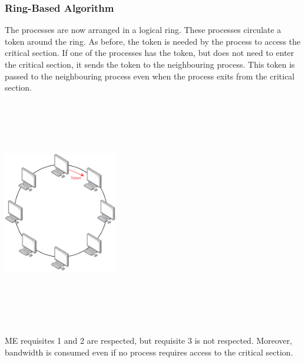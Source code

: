 \documentclass{article}
\begin{document}
\subsubsection{Ring-Based Algorithm}
The processes are now arranged in a logical ring. These processes circulate a token around the ring. As before, the token is needed by the process to access the critical section. If one of the processes has the token, but does not need to enter the critical section, it sends the token to the neighbouring process. This token is passed to the neighbouring process even when the process exits from the critical section.
\begin{center}
	\includegraphics[width=5cm, height=10cm, keepaspectratio]{assets/ring-based.pdf}
\end{center}
ME requisites 1 and 2 are respected, but requisite 3 is not respected. Moreover, bandwidth is consumed even if no process requires access to the critical section.
\end{document}
